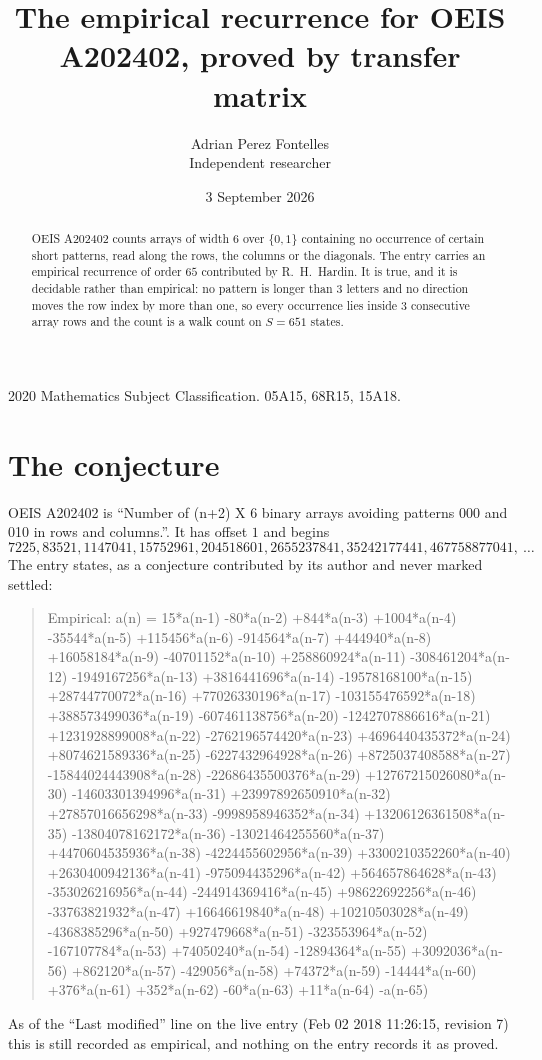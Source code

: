 \documentclass[11pt,a4paper]{article}
\title{The empirical recurrence for OEIS A202402, proved by transfer matrix}
\author{Adrian Perez Fontelles\\ \small Independent researcher}
\date{3 September 2026}
\theoremstyle{plain}
\theoremstyle{definition}
\begin{document}
\maketitle

\begin{abstract}
OEIS A202402 counts arrays of width $6$ over $\{0,1\}$ containing no occurrence of certain short
patterns, read along the rows, the columns or the diagonals. The entry carries an empirical
recurrence of order $65$ contributed by R.~H.~Hardin. It is true, and it is decidable
rather than empirical: no pattern is longer than $3$ letters and no direction moves the row
index by more than one, so every occurrence lies inside $3$ consecutive array rows and the
count is a walk count on $S=651$ states.
\end{abstract}

\noindent\small 2020 Mathematics Subject Classification. 05A15, 68R15, 15A18.\normalsize

\section{The conjecture}

OEIS A202402 is ``Number of (n+2) X 6 binary arrays avoiding patterns 000 and 010 in rows and columns.''. It has offset $1$ and begins
\[
7225, 83521, 1147041, 15752961, 204518601, 2655237841, 35242177441, 467758877041,\ \dots
\]
The entry states, as a conjecture contributed by its author and never marked settled:
\begin{quote}
Empirical: a(n) = 15*a(n-1) -80*a(n-2) +844*a(n-3) +1004*a(n-4) -35544*a(n-5) +115456*a(n-6) -914564*a(n-7) +444940*a(n-8) +16058184*a(n-9) -40701152*a(n-10) +258860924*a(n-11) -308461204*a(n-12) -1949167256*a(n-13) +3816441696*a(n-14) -19578168100*a(n-15) +28744770072*a(n-16) +77026330196*a(n-17) -103155476592*a(n-18) +388573499036*a(n-19) -607461138756*a(n-20) -1242707886616*a(n-21) +1231928899008*a(n-22) -2762196574420*a(n-23) +4696440435372*a(n-24) +8074621589336*a(n-25) -6227432964928*a(n-26) +8725037408588*a(n-27) -15844024443908*a(n-28) -22686435500376*a(n-29) +12767215026080*a(n-30) -14603301394996*a(n-31) +23997892650910*a(n-32) +27857016656298*a(n-33) -9998958946352*a(n-34) +13206126361508*a(n-35) -13804078162172*a(n-36) -13021464255560*a(n-37) +4470604535936*a(n-38) -4224455602956*a(n-39) +3300210352260*a(n-40) +2630400942136*a(n-41) -975094435296*a(n-42) +564657864628*a(n-43) -353026216956*a(n-44) -244914369416*a(n-45) +98622692256*a(n-46) -33763821932*a(n-47) +16646619840*a(n-48) +10210503028*a(n-49) -4368385296*a(n-50) +927479668*a(n-51) -323553964*a(n-52) -167107784*a(n-53) +74050240*a(n-54) -12894364*a(n-55) +3092036*a(n-56) +862120*a(n-57) -429056*a(n-58) +74372*a(n-59) -14444*a(n-60) +376*a(n-61) +352*a(n-62) -60*a(n-63) +11*a(n-64) -a(n-65)
\end{quote}
As of the ``Last modified'' line on the live entry (Feb 02 2018 11:26:15, revision 7) this is still
recorded as empirical, and nothing on the entry records it as proved.
\end{document}
